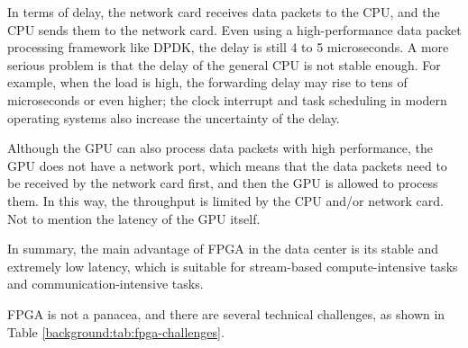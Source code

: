 In terms of delay, the network card receives data packets to the CPU, and the CPU sends them to the network card. Even using a high-performance data packet processing framework like DPDK, the delay is still 4 to 5 microseconds. A more serious problem is that the delay of the general CPU is not stable enough. For example, when the load is high, the forwarding delay may rise to tens of microseconds or even higher; the clock interrupt and task scheduling in modern operating systems also increase the uncertainty of the delay.

Although the GPU can also process data packets with high performance, the GPU does not have a network port, which means that the data packets need to be received by the network card first, and then the GPU is allowed to process them. In this way, the throughput is limited by the CPU and/or network card. Not to mention the latency of the GPU itself.

In summary, the main advantage of FPGA in the data center is its stable and extremely low latency, which is suitable for stream-based compute-intensive tasks and communication-intensive tasks.

FPGA is not a panacea, and there are several technical challenges, as shown in Table \ref{background:tab:fpga-challenges}.

